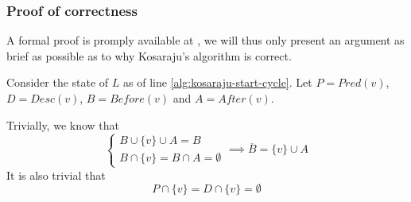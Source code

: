 \subsubsection{Proof of correctness}
A formal proof is promply available at \cite[p.~619]{intro-alg}, we will thus only present an argument as brief as possible as to why Kosaraju's algorithm is correct.\par
Consider the state of $L$ as of line \ref{alg:kosaraju-start-cycle}. Let $P = Pred(v)$, $D = Desc(v)$, $B = Before(v)$ and $A=After(v)$.\par
Trivially, we know that
\begin{equation} \label{eq:ABpart}
    \begin{cases}
        B \cup \{v\} \cup A = B \\
        B \cap \{v\} = B \cap A = \emptyset
    \end{cases} \implies \overline{B} = \{v\} \cup A
\end{equation}
It is also trivial that
\begin{equation} \label{eq:vnotinPD}
    P \cap \{v\} = D\cap\{v\}=\emptyset
\end{equation}

